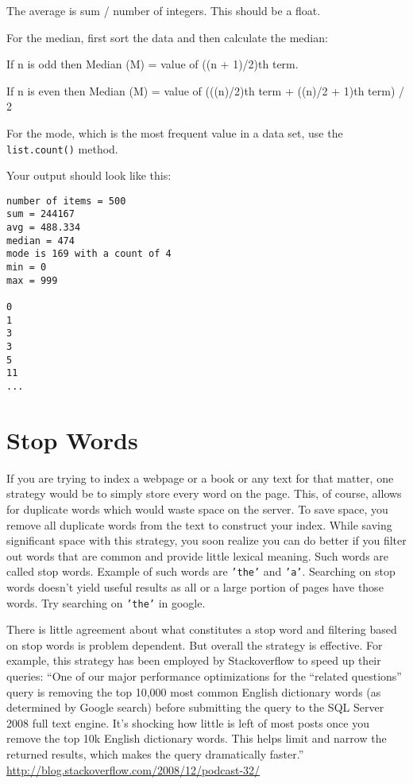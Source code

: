 \documentclass[12pt]{article}
\begin{document}
\begin{enumerate}
The average is sum / number of integers. This should be a float.

For the median, first sort the data and then calculate the median:
 
If n is odd then Median (M) = value of ((n + 1)/2)th term.

If n is even then Median (M) = value of (((n)/2)th term + ((n)/2 + 1)th term) / 2

For the mode, which is the most frequent value in a data set, use the \texttt{list.count()} method.

Your output should look like this:

\begin{verbatim}
number of items = 500
sum = 244167
avg = 488.334
median = 474
mode is 169 with a count of 4
min = 0
max = 999

0
1
3
3
5
11
...
\end{verbatim}

\section*{Stop Words}

If you are trying to index a webpage or a book or any text for that matter, one strategy would be to simply store every word on the page. This, of course, allows for duplicate words which would waste space on the server. To save space, you remove all duplicate words from the text to construct your index. While saving significant space with this strategy, you soon realize you can do better if you filter out words that are common and provide little lexical meaning. Such words are called stop words. Example of such words are \texttt{'the'} and \texttt{'a'}. Searching on stop words doesn't yield useful results as all or a large portion of pages have those words. Try searching on \texttt{'the'} in google.

There is little agreement about what constitutes a stop word and filtering based on stop words is problem dependent. But overall the strategy is effective. For example, this strategy has been employed by Stackoverflow to speed up their queries: ``One of our major performance optimizations for the “related questions” query is removing the top 10,000 most common English dictionary words (as determined by Google search) before submitting the query to the SQL Server 2008 full text engine. It’s shocking how little is left of most posts once you remove the top 10k English dictionary words. This helps limit and narrow the returned results, which makes the query dramatically faster.'' \url{http://blog.stackoverflow.com/2008/12/podcast-32/}


\end{enumerate}
\end{document}
